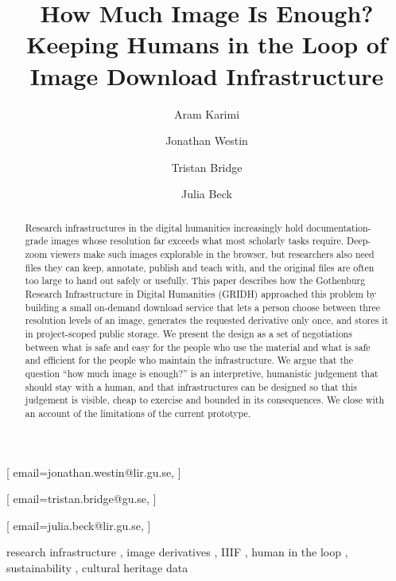 \documentclass{dhnbpub}
\begin{document}


\title{How Much Image Is Enough? Keeping Humans in the Loop of Image Download Infrastructure}

\author[1]{Aram Karimi}
\cormark[1]
\address[1]{Gothenburg Research Infrastructure in Digital Humanities (GRIDH), University of Gothenburg, Sweden}

\author[1]{Jonathan Westin}[%
email=jonathan.westin@lir.gu.se,
]

\author[1]{Tristan Bridge}[%
email=tristan.bridge@gu.se,
]

\author[1]{Julia Beck}[%
email=julia.beck@lir.gu.se,
]


\begin{abstract}
  Research infrastructures in the digital humanities increasingly hold
  documentation-grade images whose resolution far exceeds what most
  scholarly tasks require. Deep-zoom viewers make such images explorable
  in the browser, but researchers also need files they can keep,
  annotate, publish and teach with, and the original files are often too
  large to hand out safely or usefully. This paper describes how the
  Gothenburg Research Infrastructure in Digital Humanities (GRIDH)
  approached this problem by building a small on-demand download service
  that lets a person choose between three resolution levels of an image,
  generates the requested derivative only once, and stores it in
  project-scoped public storage. We present the design as a set of
  negotiations between what is safe and easy for the people who use the
  material and what is safe and efficient for the people who maintain
  the infrastructure. We argue that the question ``how much image is
  enough?'' is an interpretive, humanistic judgement that should stay
  with a human, and that infrastructures can be designed so that this
  judgement is visible, cheap to exercise and bounded in its
  consequences. We close with an account of the limitations of the
  current prototype.
\end{abstract}

\begin{keywords}
  research infrastructure \sep
  image derivatives \sep
  IIIF \sep
  human in the loop \sep
  sustainability \sep
  cultural heritage data
\end{keywords}
\end{document}
